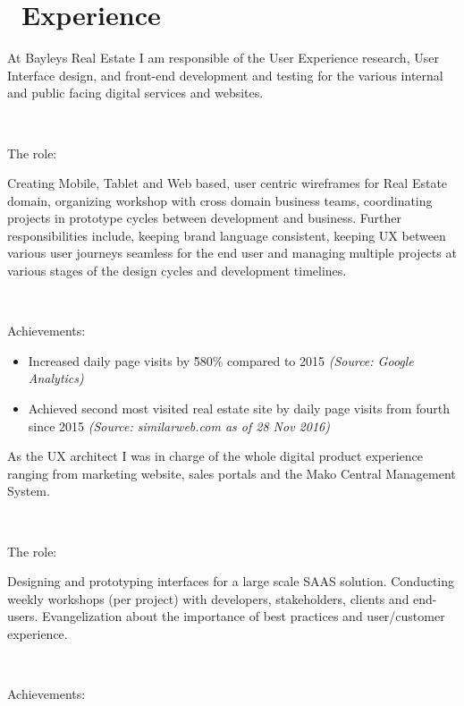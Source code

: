 \documentclass{resume}
\begin{document}
\section{\faUsers\ Experience}
  At Bayleys Real Estate I am responsible of the User Experience research, User Interface design, and front-end development and testing for the various internal and public facing digital services and websites.\par
  ~\par
  {The role:}\par
  Creating Mobile, Tablet and Web based, user centric wireframes for Real Estate domain, organizing workshop with cross domain business teams, coordinating projects in prototype cycles between development and business. Further responsibilities include, keeping brand language consistent, keeping UX between various user journeys seamless for the end user and managing multiple projects at various stages of the design cycles and development timelines.\par
  ~\par
  {Achievements:}\par
  \begin{itemize}
    \item Increased daily page visits by \~580\% compared to 2015 \textit{(Source: Google Analytics)}
    \item Achieved second most visited real estate site by daily page visits from fourth since 2015 \textit{(Source: similarweb.com as of 28 Nov 2016)}
  \end{itemize}
  As the UX architect I was in charge of the whole digital product experience ranging from marketing website, sales portals and the Mako Central Management System.\par
  ~\par
  {The role:}\par
  Designing and prototyping interfaces for a large scale SAAS solution. Conducting weekly workshops (per project) with developers, stakeholders, clients and end-users. Evangelization about the importance of best practices and user/customer experience.\par
  ~\par
  {Achievements:}\par
\end{document}
